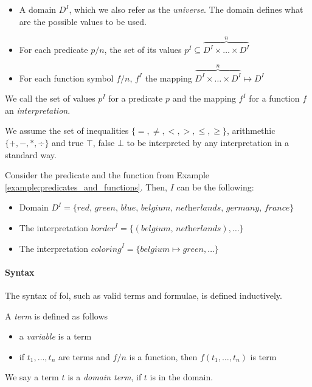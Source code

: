 \begin{itemize}
  \item A domain $D^I$, which we also refer as the \textit{universe}. The domain defines what are the possible values to be used.
  \item For each predicate $p/n$, the set of its values $p^I \subseteq \overbrace{D^I \times \dots \times D^I}^{n}$
  \item For each function symbol $f/n$,  $f^I$ the mapping  $\overbrace{D^I \times \dots \times D^I}^{n} \mapsto D^I$
\end{itemize}
We call the set of values $p^I$ for a predicate $p$  and the mapping $f^I$ for a function $f$ an \textit{interpretation}.

We assume the set of inequalities $\{ =, \neq, <, >, \leq, \geq \}$,  arithmethic $\{+, -, *, \div \}$ and true $\top$, false $\bot$ to be interpreted by any interpretation in a standard way.

\begin{example}
  Consider the predicate and the function from Example \ref{example:predicates_and_functions}. Then, $I$ can be the following:
  \begin{itemize}
    \item Domain $D^I = \{ \textit{red, green, blue, belgium, netherlands, germany, france} \}$
    \item The interpretation $\textit{border}^I = \{ (\textit{belgium, netherlands}), \dots \}$                                                                                     
    \item The interpretation $\textit{coloring}^I = \{ \textit{belgium} \mapsto \textit{green}, \dots \}$                                                                                     
  \end{itemize}
\end{example}


\paragraph{Syntax} 

The syntax of \acrlong{fol}, such as valid terms and formulae, is defined inductively.

A \textit{term} is defined as follows  
\begin{itemize}
  \item a \textit{variable} is a term
  \item if $t_1,\dots,t_n$ are terms and $f/n$ is a function, then $f(t_1,\dots,t_n)$ is term
\end{itemize}
We say a term $t$ is a \textit{domain term}, if $t$ is in the domain.


